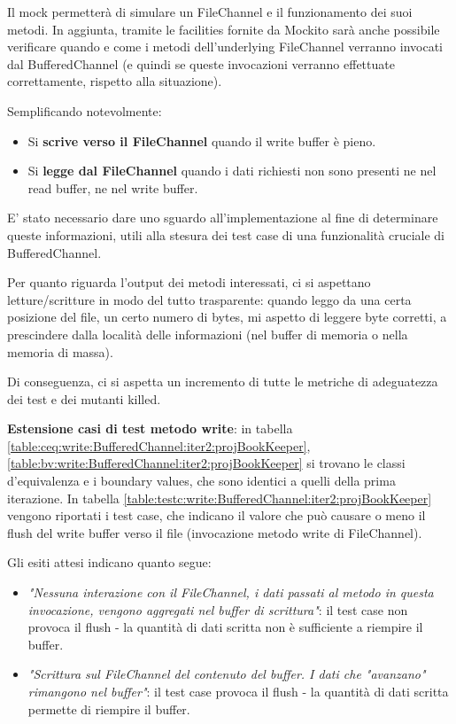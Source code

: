 \documentclass[10pt, a4paper]{article}
\newcommand{\gettablelabel}[5]{table:#1:#2:#3:iter#4:proj#5}
\def\bookkeeper{BookKeeper}
\begin{document}
	Il mock permetterà di simulare un FileChannel e il funzionamento
	dei suoi metodi. 
	In aggiunta, tramite le facilities fornite da Mockito sarà anche possibile verificare quando e come i
	metodi dell'underlying FileChannel verranno invocati dal BufferedChannel (e quindi se queste invocazioni
	verranno effettuate correttamente, rispetto alla situazione).
	
	Semplificando notevolmente:
	\begin{itemize}
		\item Si \textbf{scrive verso il FileChannel} quando il write buffer è pieno.
		\item Si \textbf{legge dal FileChannel} quando i dati richiesti non sono presenti ne nel 
		read buffer, ne nel write buffer.
	\end{itemize}
	
	E' stato necessario dare uno sguardo
	all'implementazione al fine di determinare queste informazioni, utili alla stesura dei test case di una
	funzionalità cruciale di BufferedChannel.
	
	Per quanto riguarda l'output dei metodi interessati, ci si aspettano letture/scritture in modo del tutto
	trasparente: quando leggo da una certa posizione del file, un certo numero di bytes, mi aspetto di leggere
	byte corretti, a prescindere dalla località delle informazioni (nel buffer di memoria o nella memoria di
	massa).
	
	Di conseguenza, ci si aspetta un incremento di tutte le metriche di adeguatezza dei test e dei mutanti killed.
	
	\textbf{Estensione casi di test metodo write}: in tabella 
	\ref{\gettablelabel{ceq}{write}{BufferedChannel}{2}{\bookkeeper}},
	\ref{\gettablelabel{bv}{write}{BufferedChannel}{2}{\bookkeeper}} si trovano le classi d'equivalenza e i
	boundary values, che sono identici a quelli della prima iterazione.
	In tabella \ref{\gettablelabel{testc}{write}{BufferedChannel}{2}{\bookkeeper}} vengono riportati i test
	case, che indicano il valore che può causare o meno il flush del write buffer verso il file (invocazione
	metodo write di FileChannel).
	
	Gli esiti attesi indicano quanto segue:
	\begin{itemize}
		\item \textit{"Nessuna interazione con il FileChannel, 
		i dati passati al metodo in questa invocazione, vengono
		aggregati nel buffer di scrittura"}: il test case non provoca il flush -
		la quantità di dati scritta non è sufficiente a riempire il buffer.
		\item \textit{"Scrittura sul FileChannel del contenuto
		del buffer. I dati che "avanzano" rimangono nel buffer"}: il test case 
		provoca il flush - la quantità di dati scritta permette di riempire il
		buffer.
	\end{itemize}
	
\end{document}
